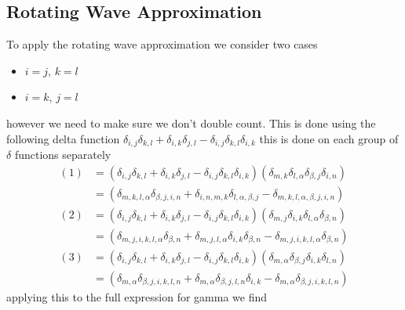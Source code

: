 \subsection{Rotating Wave Approximation}
To apply the rotating wave approximation we consider
two cases
\begin{itemize}
    \item \(i=j\), \(k=l\)
    \item \(i=k\), \(j=l\)
\end{itemize}
however we need to make sure we don't
double count. This is done using
the following delta
function
\(\delta_{i,j}\delta_{k,l}
+ \delta_{i,k}\delta_{j,l}
- \delta_{i,j}\delta_{k,l}
\delta_{i,k}\)
this is done on each group of
\(\delta \) functions separately
\begin{align}
    (1) & =  (\delta_{i,j}\delta_{k,l}
    + \delta_{i,k}\delta_{j,l}
    - \delta_{i,j}\delta_{k,l}\delta_{i,k}) (
    \delta_{m, k}\delta_{l, \alpha}
    \delta_{\beta, j}\delta_{i, n})                          \\
        & =  (\delta_{m, k, l, \alpha}\delta_{\beta, j,i, n}
    + \delta_{i, n, m, k}\delta_{l, \alpha, \beta, j}
    - \delta_{m, k, l, \alpha, \beta, j,i, n})               \\
    (2) & =  (\delta_{i,j}\delta_{k,l}
    + \delta_{i,k}\delta_{j,l}
    - \delta_{i,j}\delta_{k,l}
    \delta_{i,k}) (
    \delta_{m, j}\delta_{i, k}
    \delta_{l, \alpha}\delta_{\beta, n})                     \\
        & =  (\delta_{m, j,i, k,l, \alpha}\delta_{\beta, n}
    + \delta_{m, j,l, \alpha}\delta_{i, k}\delta_{\beta, n}
    - \delta_{m, j,i, k, l, \alpha}\delta_{\beta, n} )       \\
    (3) & =  (\delta_{i,j}\delta_{k,l}
    + \delta_{i,k}\delta_{j,l}
    - \delta_{i,j}\delta_{k,l}
    \delta_{i,k}) (
    \delta_{m, \alpha}\delta_{\beta, j}
    \delta_{i, k}\delta_{l, n})                              \\
        & =  (\delta_{m, \alpha}\delta_{\beta, j,i, k, l, n}
    + \delta_{m, \alpha}\delta_{\beta, j,l, n}
    \delta_{i, k}
    - \delta_{m, \alpha}\delta_{\beta, j,i, k,l, n})
\end{align}
applying this to the full expression
for gamma we find



